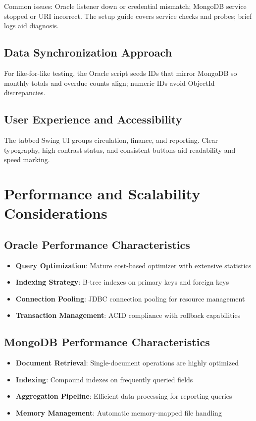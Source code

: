 \documentclass[12pt,a4paper]{article}
\begin{document}
Common issues: Oracle listener down or credential mismatch; MongoDB service stopped or URI incorrect. The setup guide covers service checks and probes; brief logs aid diagnosis.

\subsection{Data Synchronization Approach}

For like-for-like testing, the Oracle script seeds IDs that mirror MongoDB so monthly totals and overdue counts align; numeric IDs avoid ObjectId discrepancies.

\subsection{User Experience and Accessibility}

The tabbed Swing UI groups circulation, finance, and reporting. Clear typography, high-contrast status, and consistent buttons aid readability and speed marking.


\section{Performance and Scalability Considerations}

\subsection{Oracle Performance Characteristics}
\begin{itemize}
    \item \textbf{Query Optimization}: Mature cost-based optimizer with extensive statistics
    \item \textbf{Indexing Strategy}: B-tree indexes on primary keys and foreign keys
    \item \textbf{Connection Pooling}: JDBC connection pooling for resource management
    \item \textbf{Transaction Management}: ACID compliance with rollback capabilities
\end{itemize}

\subsection{MongoDB Performance Characteristics}
\begin{itemize}
    \item \textbf{Document Retrieval}: Single-document operations are highly optimized
    \item \textbf{Indexing}: Compound indexes on frequently queried fields
    \item \textbf{Aggregation Pipeline}: Efficient data processing for reporting queries
    \item \textbf{Memory Management}: Automatic memory-mapped file handling
\end{itemize}
\end{document}
